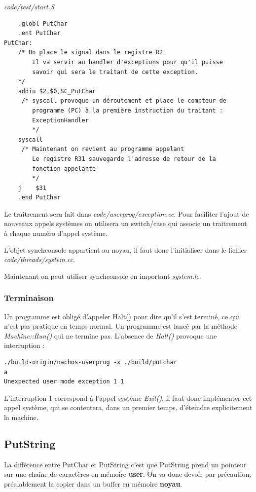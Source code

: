 \documentclass[a4paper,10pt]{article}
\begin{document}
\textit{code/test/start.S}
\begin{lstlisting}
    .globl PutChar
    .ent PutChar
PutChar:
    /* On place le signal dans le registre R2
        Il va servir au handler d'exceptions pour qu'il puisse
        savoir qui sera le traitant de cette exception.
    */
    addiu $2,$0,SC_PutChar
     /* syscall provoque un déroutement et place le compteur de
        programme (PC) à la première instruction du traitant :
        ExceptionHandler
        */
    syscall
     /* Maintenant on revient au programme appelant
        Le registre R31 sauvegarde l'adresse de retour de la
        fonction appelante
        */
    j    $31
    .end PutChar
\end{lstlisting}

Le traitrement sera fait dans \textit{code/userprog/exception.cc}. Pour
faciliter l'ajout de nouveaux appels systèmes on utilisera un switch/case qui
associe un traitrement à chaque numéro d'appel système.

L'objet synchconsole appartient au noyau, il faut donc l'initialiser dans le
fichier \textit{code/threads/system.cc}.

Maintenant on peut utiliser synchconsole en important \textit{system.h}.

\subsubsection{Terminaison}
Un programme est obligé d'appeler Halt() pour dire qu'il s'est terminé, ce qui
n'est pas pratique en temps normal. Un programme est lancé par la méthode
\textit{Machine::Run()} qui ne termine pas. L'absence de \textit{Halt()}
provoque une interruption :

\begin{lstlisting}
./build-origin/nachos-userprog -x ./build/putchar
a
Unexpected user mode exception 1 1
\end{lstlisting}

L'interruption 1 correspond à l'appel système \textit{Exit()}, il faut
donc implémenter cet appel système, qui se contentera, dans un premier temps,
d'éteindre explicitement la machine.

\subsection{PutString}
La différence entre PutChar et PutString c'est que PutString prend un pointeur
sur une chaine de caractères en mémoire \textbf{user}. On va donc devoir par
précaution, préalablement la copier dans un buffer en mémoire \textbf{noyau}.
\end{document}
